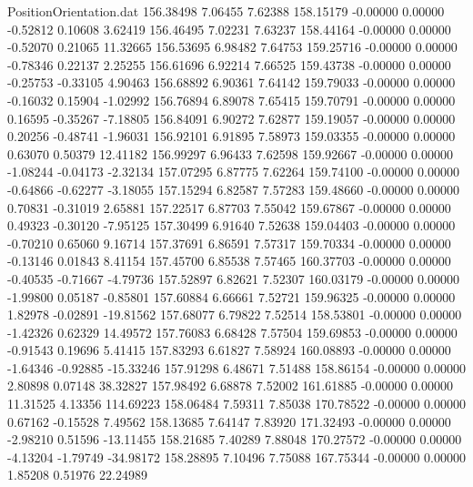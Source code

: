 \begin{filecontents}{PositionOrientation.dat}
 156.38498    7.06455    7.62388   158.15179   -0.00000    0.00000   -0.52812    0.10608    3.62419
 156.46495    7.02231    7.63237   158.44164   -0.00000    0.00000   -0.52070    0.21065   11.32665
 156.53695    6.98482    7.64753   159.25716   -0.00000    0.00000   -0.78346    0.22137    2.25255
 156.61696    6.92214    7.66525   159.43738   -0.00000    0.00000   -0.25753   -0.33105    4.90463
 156.68892    6.90361    7.64142   159.79033   -0.00000    0.00000   -0.16032    0.15904   -1.02992
 156.76894    6.89078    7.65415   159.70791   -0.00000    0.00000    0.16595   -0.35267   -7.18805
 156.84091    6.90272    7.62877   159.19057   -0.00000    0.00000    0.20256   -0.48741   -1.96031
 156.92101    6.91895    7.58973   159.03355   -0.00000    0.00000    0.63070    0.50379   12.41182
 156.99297    6.96433    7.62598   159.92667   -0.00000    0.00000   -1.08244   -0.04173   -2.32134
 157.07295    6.87775    7.62264   159.74100   -0.00000    0.00000   -0.64866   -0.62277   -3.18055
 157.15294    6.82587    7.57283   159.48660   -0.00000    0.00000    0.70831   -0.31019    2.65881
 157.22517    6.87703    7.55042   159.67867   -0.00000    0.00000    0.49323   -0.30120   -7.95125
 157.30499    6.91640    7.52638   159.04403   -0.00000    0.00000   -0.70210    0.65060    9.16714
 157.37691    6.86591    7.57317   159.70334   -0.00000    0.00000   -0.13146    0.01843    8.41154
 157.45700    6.85538    7.57465   160.37703   -0.00000    0.00000   -0.40535   -0.71667   -4.79736
 157.52897    6.82621    7.52307   160.03179   -0.00000    0.00000   -1.99800    0.05187   -0.85801
 157.60884    6.66661    7.52721   159.96325   -0.00000    0.00000    1.82978   -0.02891  -19.81562
 157.68077    6.79822    7.52514   158.53801   -0.00000    0.00000   -1.42326    0.62329   14.49572
 157.76083    6.68428    7.57504   159.69853   -0.00000    0.00000   -0.91543    0.19696    5.41415
 157.83293    6.61827    7.58924   160.08893   -0.00000    0.00000   -1.64346   -0.92885  -15.33246
 157.91298    6.48671    7.51488   158.86154   -0.00000    0.00000    2.80898    0.07148   38.32827
 157.98492    6.68878    7.52002   161.61885   -0.00000    0.00000   11.31525    4.13356  114.69223
 158.06484    7.59311    7.85038   170.78522   -0.00000    0.00000    0.67162   -0.15528    7.49562
 158.13685    7.64147    7.83920   171.32493   -0.00000    0.00000   -2.98210    0.51596  -13.11455
 158.21685    7.40289    7.88048   170.27572   -0.00000    0.00000   -4.13204   -1.79749  -34.98172
 158.28895    7.10496    7.75088   167.75344   -0.00000    0.00000    1.85208    0.51976   22.24989

\end{filecontents}

